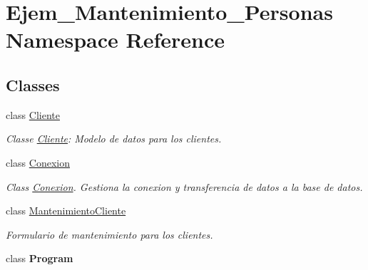 \hypertarget{namespace_ejem___mantenimiento___personas}{}\section{Ejem\+\_\+\+Mantenimiento\+\_\+\+Personas Namespace Reference}
\label{namespace_ejem___mantenimiento___personas}
\subsection*{Classes}
\begin{DoxyCompactItemize}
\item 
class \mbox{\hyperlink{class_ejem___mantenimiento___personas_1_1_cliente}{Cliente}}
\begin{DoxyCompactList}\small\item\em Classe \mbox{\hyperlink{class_ejem___mantenimiento___personas_1_1_cliente}{Cliente}}\+: Modelo de datos para los clientes. \end{DoxyCompactList}\item 
class \mbox{\hyperlink{class_ejem___mantenimiento___personas_1_1_conexion}{Conexion}}
\begin{DoxyCompactList}\small\item\em Class \mbox{\hyperlink{class_ejem___mantenimiento___personas_1_1_conexion}{Conexion}}. Gestiona la conexion y transferencia de datos a la base de datos. \end{DoxyCompactList}\item 
class \mbox{\hyperlink{class_ejem___mantenimiento___personas_1_1_mantenimiento_cliente}{Mantenimiento\+Cliente}}
\begin{DoxyCompactList}\small\item\em Formulario de mantenimiento para los clientes. \end{DoxyCompactList}\item 
class {\bfseries Program}
\end{DoxyCompactItemize}
